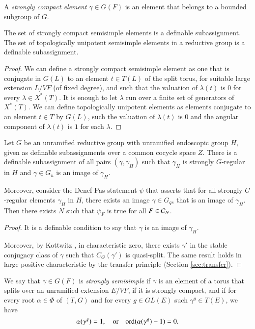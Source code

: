 A {\it strongly compact element} $\gamma\in G(F)$ is an element that
belongs to a bounded subgroup of $G$.

\begin{lemma} 
The set of strongly
  compact semisimple elements is a definable subassignment.
  The set of topologically unipotent semisimple elements in a
  reductive group is a definable subassignment.  
\end{lemma}

\begin{proof} We can define a strongly compact semisimple element as
  one that is conjugate in $G(L)$ to an element $t\in T(L)$ of the
  split torus, for suitable large extension $L/VF$
  (of fixed degree), and such that the valuation of $\lambda(t)$ is
  $0$ for every $\lambda\in X^*(T)$.  It is enough to let $\lambda$ run
  over a finite set of generators of $X^*(T)$.  We can define topologically
  unipotent elements as elements conjugate to an element $t\in T$ by
  $G(L)$, such the valuation of $\lambda(t)$ is $0$ and the angular
  component of $\lambda(t)$ is $1$ for each $\lambda$.
\end{proof}


\begin{lemma} 
  Let $G$ be an unramified reductive group with unramified endoscopic
  group $H$, given as definable subassignments over a common cocycle
  space $Z$.  There is a definable subassignment of all pairs
  $(\gamma,\gamma_H)$ such that $\gamma_H$ is strongly $G$-regular in
  $H$ and $\gamma\in G_u$ is an image of $\gamma_H$.

  Moreover, consider the
  Denef-Pas statement $\psi$ that asserts that for all strongly
  $G$-regular elements $\gamma_H$ in $H$, there exists an image
  $\gamma\in G_{qs}$ that is an image of $\gamma_H$.  Then there
  exists $N$ such that $\psi_F$ is true for all $F\in\mathcal C_N$.
\end{lemma}

\begin{proof}  It is a definable condition to say that $\gamma$ is an
  image of $\gamma_H$.

  Moreover, by Kottwitz \cite[3.3]{kottwitz1982rational}, in
  characteristic zero, there exists $\gamma'$ in the stable conjugacy
  class of $\gamma$ such that $C_G(\gamma')$ is quasi-split.  The same
  result holds in large positive characteristic by the transfer
  principle (Section \ref{sec:transfer}).
\end{proof}

\begin{definition} 
  We say that $\gamma\in G(F)$ is {\it strongly semisimple} if $\gamma$
  is an element of a torus that splits over an unramified extension
  $E/VF$, if it is strongly compact, and if for every root $\alpha\in
  \Phi$ of $(T,G)$ and for every $g\in GL(E)$ such $\gamma^g\in T(E)$,
  we have
  \[
  \alpha(\gamma^g) = 1,\quad\text{or}
\quad {\operatorname{ord}}(\alpha(\gamma^g)-1)=0.
  \]
 \end{definition}

